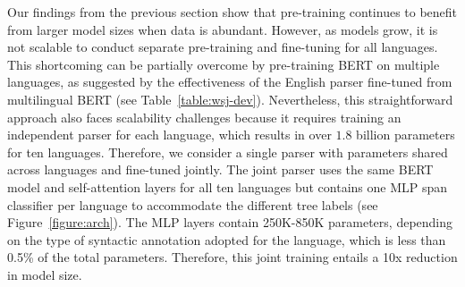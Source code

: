 \documentclass[11pt,a4paper]{article}
\begin{document}
\begin{table}[h]
\begin{center}
\end{center}
\caption{\label{table:wsj-test} Comparison of F1 scores on the WSJ test set.}
\end{table}

Our findings from the previous section show that pre-training continues to benefit from larger model sizes when data is abundant. However, as models grow, it is not scalable to conduct separate pre-training and fine-tuning for all languages. This shortcoming can be partially overcome by pre-training BERT on multiple languages, as suggested by the effectiveness of the English parser fine-tuned from multilingual BERT (see Table~\ref{table:wsj-dev}). Nevertheless, this straightforward approach also faces scalability challenges because it requires training an independent parser for each language, which results in over $1.8$ billion parameters for ten languages. Therefore, we consider a single parser with parameters shared across languages and fine-tuned jointly. The joint parser uses the same BERT model and self-attention layers for all ten languages but contains one MLP span classifier per language to accommodate the different tree labels (see Figure~\ref{figure:arch}). The MLP layers contain 250K-850K parameters, depending on the type of syntactic annotation adopted for the language, which is less than 0.5\% of the total parameters. Therefore, this joint training entails a 10x reduction in model size.
\end{document}
